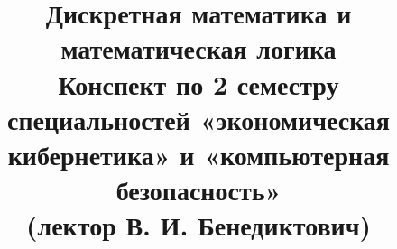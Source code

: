 \documentclass[a4paper, 12pt]{report}
\title{\textbf{\Huge{Дискретная математика и математическая логика}}\\Конспект по 2 семестру 
	специальностей «экономическая кибернетика» и «компьютерная безопасность»\\(лектор В. И. Бенедиктович)} %
\date{} %
\newenvironment{example} %
{\par\noindent{\textsc{\textbf{Пример}.}}} %
\begin{document}
	\maketitle %
	\tableofcontents{}
	\chapter{Булевы функции} %
	\section*{Замкнутые классы булевых функций}

Пусть $A \subseteq P$\\
$\bullet$ \textbf{Замыканием} $A$ называется множество функций из $P_2$, которые можно выразить в виде формул над $A$ и обозначается $[A]$ .\\\\
Свойства замыкания:
\begin{enumerate}
    \item $A \subseteq [A]$
    \item $A \subseteq B \Rightarrow [A] \subseteq [B]$
    \item $\big[[A]\big] = [A]$
    \item $[A] \cup [B] \subseteq [A \cup B]$
    \end{enumerate}
$\bullet$ 
$A$ - \textbf{полная система} булевой функции, если $[A] = P_2$.\\
$\bullet$ 
Система буевых функций $A$ \textbf{замкнутая}, если $[A] = A$.\\
\begin{example}
$A = \{1, x_1 \oplus x_2\}$ не замкнута, так как $1  = 0 \notin A$\\
\end{example}
\end{document}
